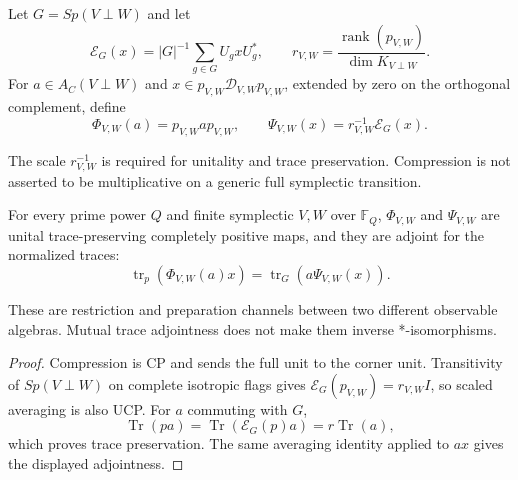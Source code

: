 \begin{definition}
Let $G=Sp(V\perp W)$ and let
\[
 \mathcal E_G(x)=|G|^{-1}\sum_{g\in G}U_gxU_g^*,
 \qquad
 r_{V,W}=\frac{\operatorname{rank}(p_{V,W})}{\dim K_{V\perp W}}.
\]
For $a\in A_C(V\perp W)$ and
$x\in p_{V,W}\mathcal D_{V,W}p_{V,W}$, extended by zero on the orthogonal
complement, define
\[
 \Phi_{V,W}(a)=p_{V,W}ap_{V,W},\qquad
 \Psi_{V,W}(x)=r_{V,W}^{-1}\mathcal E_G(x).
\]
\end{definition}
\begin{scope}
The scale $r_{V,W}^{-1}$ is required for unitality and trace preservation.
Compression is not asserted to be multiplicative on a generic full
symplectic transition.
\end{scope}

\begin{theorem}
{\normalfont\statusProved}\quad
For every prime power $Q$ and finite symplectic $V,W$ over $\mathbb F_Q$,
$\Phi_{V,W}$ and $\Psi_{V,W}$ are unital trace-preserving completely
positive maps, and they are adjoint for the normalized traces:
\[
 \operatorname{tr}_{p}(\Phi_{V,W}(a)x)
   =\operatorname{tr}_{G}(a\Psi_{V,W}(x)).
\]
\end{theorem}
\begin{scope}
These are restriction and preparation channels between two different
observable algebras.  Mutual trace adjointness does not make them inverse
*-isomorphisms.
\end{scope}
\begin{proof}
Compression is CP and sends the full unit to the corner unit.  Transitivity
of $Sp(V\perp W)$ on complete isotropic flags gives
$\mathcal E_G(p_{V,W})=r_{V,W}I$, so scaled averaging is also UCP.  For
$a$ commuting with $G$,
\[
 \operatorname{Tr}(pa)=\operatorname{Tr}(\mathcal E_G(p)a)
   =r\operatorname{Tr}(a),
\]
which proves trace preservation.  The same averaging identity applied to
$ax$ gives the displayed adjointness.
\end{proof}

